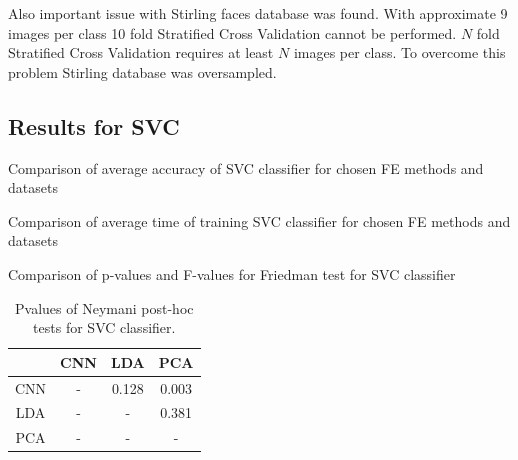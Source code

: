 \documentclass[a4paper, 10 pt, conference]{ieeeconf}
\begin{document}
Also important issue with Stirling faces database was found. With approximate 9 images per class 10 fold Stratified Cross Validation cannot be performed. $N$ fold Stratified Cross Validation requires at least $N$ images per class. To overcome this problem Stirling database was oversampled.


\subsection{Results for SVC}


\begin{table}[!h]
    \centering
    \caption{Comparison of average accuracy of SVC classifier for chosen FE methods and datasets}
    
    \label{table:svm_acc_comparison}
\end{table}

\begin{table}[!h]
    \centering
    \caption{Comparison of average time of training SVC classifier for chosen FE methods and datasets}
    
    \label{table:svm_fit_time_comparison}
\end{table}

\begin{table}[!h]
    \centering
    \caption{Comparison of p-values and F-values for Friedman test for SVC classifier}
    
    \label{table:svm_pvalues}
\end{table}

\begin{table}[!h]
    \centering
    \caption{Pvalues of Neymani post-hoc tests for SVC classifier.}
    \begin{tabular}{|c|c|c|c|}
         \hline
          & CNN & LDA & PCA \\
         \hline
         CNN &  - &  0.128 &  0.003 \\
         \hline
         LDA &  - & - &  0.381 \\
         \hline
         PCA &  - & - & - \\
         \hline
    \end{tabular}
    \label{tab:svm_posthoc_pvalues}
\end{table}
\end{document}
